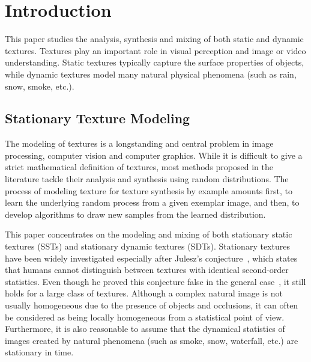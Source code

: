 \section{Introduction}

This paper studies the analysis, synthesis and mixing of both static and dynamic textures. Textures play an important role in visual perception and image or video understanding. Static textures typically capture the surface properties of objects, while dynamic textures model many natural physical phenomena (such as rain, snow, smoke, etc.).


\subsection{Stationary Texture Modeling}

The modeling of textures is a longstanding and central problem in image processing, computer vision and computer graphics. While it is difficult to give a strict mathematical definition of textures, most methods proposed in the literature tackle their analysis and synthesis using random distributions. The process of modeling texture for texture synthesis by example amounts first, to learn the underlying random process from a given exemplar image, and then, to develop algorithms to draw new samples from the learned distribution.

This paper concentrates on the modeling and mixing of both stationary static textures (SSTs) and stationary dynamic textures (SDTs).
Stationary textures have been widely investigated especially after Julesz's conjecture~\cite{julesz62}, which states that humans cannot distinguish between textures with identical second-order statistics. Even though he proved this conjecture false in the general case~\cite{Julesz71}, it still holds for a large class of textures.  Although a complex natural image is not usually homogeneous due to the presence of objects and occlusions, it can often be considered as being locally homogeneous from a statistical point of view. Furthermore, it is also reasonable to assume that the dynamical statistics of images created by natural phenomena (such as smoke, snow, waterfall, etc.) are stationary in time.


